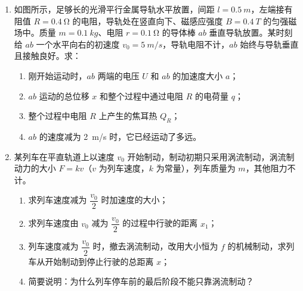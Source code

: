 \begin{enumerate}[label=\arabic*．,leftmargin=1.8em,itemsep=6pt,resume]
\item 如图所示，足够长的光滑平行金属导轨水平放置，间距 $l=\qty{0.5}{m}$，左端接有阻值 $R=\qty{0.4}{\ohm}$ 的电阻，导轨处在竖直向下、磁感应强度 $B=\qty{0.4}{T}$ 的匀强磁场中。质量 $m=\qty{0.1}{kg}$、电阻 $r=\qty{0.1}{\ohm}$ 的导体棒 $ab$ 垂直导轨放置。某时刻给 $ab$ 一个水平向右的初速度 $v_0=\qty{5}{m/s}$，导轨电阻不计，$ab$ 始终与导轨垂直且接触良好。求：
\begin{enumerate}[label=（\arabic*）,leftmargin=2.4em]
  \item 刚开始运动时，$ab$ 两端的电压 $U$ 和 $ab$ 的加速度大小 $a$；
  \item $ab$ 运动的总位移 $x$ 和整个过程中通过电阻 $R$ 的电荷量 $q$；
  \item 整个过程中电阻 $R$ 上产生的焦耳热 $Q_R$；
  \item $ab$ 的速度减为 \qty{2}{m/s} 时，它已经运动了多远。
\end{enumerate}
\begin{center}
\end{center}
\liukong{6cm}

\item 某列车在平直轨道上以速度 $v_0$ 开始制动，制动初期只采用涡流制动，涡流制动力的大小 $F=kv$（$v$ 为列车速度，$k$ 为常量），列车质量为 $m$，其他阻力不计。
\begin{enumerate}[label=（\arabic*）,leftmargin=2.4em]
  \item 求列车速度减为 $\dfrac{v_0}{2}$ 时加速度的大小；
  \item 求列车速度由 $v_0$ 减为 $\dfrac{v_0}{2}$ 的过程中行驶的距离 $x_1$；
  \item 列车速度减为 $\dfrac{v_0}{2}$ 时，撤去涡流制动，改用大小恒为 $f$ 的机械制动，求列车从开始制动到停止行驶的总距离 $x$；
  \item 简要说明：为什么列车停车前的最后阶段不能只靠涡流制动？
\end{enumerate}
\liukong{6cm}

\end{enumerate}

